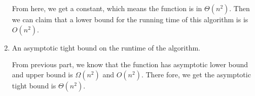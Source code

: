 \documentclass{cpsc413Solutions}
\begin{document}
\begin{problemlist}
\begin{problem}
\begin{answer}
\begin{enumerate}
      From here, we get a constant, which means the function is in $\Theta(n^2)$. Then we can claim that a lower bound for the running time of this algorithm is is ${O}(n^2)$.
   
    \item An asymptotic tight bound on the runtime of the algorithm.
    
  From previous part, we know that the function has asymptotic lower bound and upper bound is $\Omega(n^2)$ and ${O}(n^2)$. There fore, we get the asymptotic tight bound is $\Theta(n^2)$.
    
 

\end{enumerate}




\end{answer}
\end{problem}


\end{problemlist}
\end{document}
